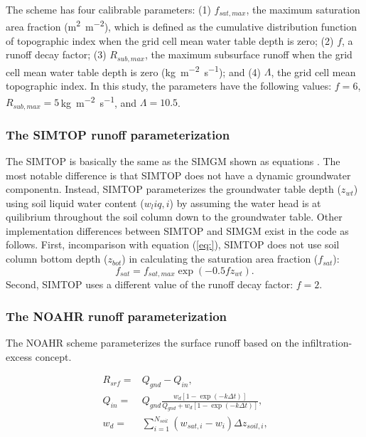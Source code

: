 \documentclass[essd]{copernicus}
\begin{document}
The scheme has four calibrable parameters: (1) $f_{sat,max}$, the maximum saturation
area fraction (\unit{m^2~m^{-2}}), which is defined as the cumulative distribution function of topographic index when the grid cell mean water table depth is zero; (2) $f$, a runoff decay factor; (3) $R_{sub,max}$, the maximum subsurface runoff when the grid cell mean water table depth is zero (\unit{kg~m^{-2}~s^{-1}}); and (4) $\Lambda$, the grid cell mean topographic index. In this study, the parameters have the following values: $f=6$, $R_{sub,max} = 5$\,\unit{kg~m^{-2}~s^{-1}}, and $\Lambda = 10.5$.

\subsubsection{The SIMTOP runoff parameterization}

The SIMTOP is basically the same as the SIMGM shown as equations . The most notable difference is that SIMTOP does not have a dynamic groundwater componentn. Instead, SIMTOP parameterizes the groundwater table depth ($z_{wt}$) using soil liquid water content ($w_liq,i$) by assuming the water head is at quilibrium throughout the soil column down to the groundwater table. Other implementation differences between SIMTOP and SIMGM exist in the code as follows. First, incomparison with equation (\ref{eq:}), SIMTOP does not use soil column bottom depth ($z_{bot}$) in calculating the saturation area fraction ($f_{sat}$):
\begin{equation}
    f_{sat} = f_{sat,max} \exp(-0.5 f z_{wt}) \text{.}
\end{equation}
Second, SIMTOP uses a different value of the runoff decay factor: $f=2$.


\subsubsection{The NOAHR runoff parameterization}

The NOAHR scheme parameterizes the surface runoff based on the
infiltration-excess concept.

\begin{align}
    R_{srf} = & Q_{gnd} - Q_{in} \text{,}                                                              \\
    Q_{in} =  & Q_{gnd} \frac{w_d [1-\exp(-k\Delta t)]}{Q_{gnd} + w_d [1 - \exp(-k\Delta t)]} \text{,} \\
    w_d =     & \sum_{i=1}^{N_{soil}} (w_{sat,i} - w_i) \Delta z_{soil,i} \text{,}
\end{align}
\end{document}

